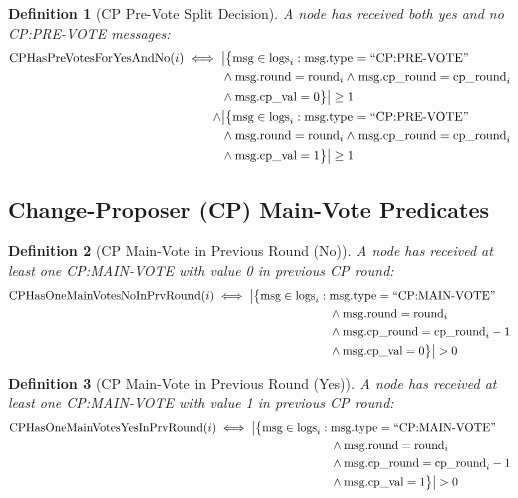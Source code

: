 \documentclass[11pt,a4paper,twoside]{article}
\newtheorem{definition}{Definition}[section]
\begin{document}
\begin{definition}[CP Pre-Vote Split Decision]
A node has received both yes and no CP:PRE-VOTE messages:
\begin{align}
\text{CPHasPreVotesForYesAndNo}(i) \iff {} & \big|\big\{\text{msg} \in \text{logs}_i : \text{msg.type} = \text{``CP:PRE-VOTE''} \notag \\
& \land \text{msg.round} = \text{round}_i \land \text{msg.cp\_round} = \text{cp\_round}_i \notag \\
& \land \text{msg.cp\_val} = 0\big\}\big| \geq 1 \notag \\
\land {} & \big|\big\{\text{msg} \in \text{logs}_i : \text{msg.type} = \text{``CP:PRE-VOTE''} \notag \\
& \land \text{msg.round} = \text{round}_i \land \text{msg.cp\_round} = \text{cp\_round}_i \notag \\
& \land \text{msg.cp\_val} = 1\big\}\big| \geq 1
\end{align}
\end{definition}

\subsection{Change-Proposer (CP) Main-Vote Predicates}

\begin{definition}[CP Main-Vote in Previous Round (No)]
A node has received at least one CP:MAIN-VOTE with value 0 in previous CP round:
\begin{align}
\text{CPHasOneMainVotesNoInPrvRound}(i) \iff \big|\big\{\text{msg} \in \text{logs}_i : {} & \text{msg.type} = \text{``CP:MAIN-VOTE''} \notag \\
& \land \text{msg.round} = \text{round}_i \notag \\
& \land \text{msg.cp\_round} = \text{cp\_round}_i - 1 \notag \\
& \land \text{msg.cp\_val} = 0\big\}\big| > 0
\end{align}
\end{definition}

\begin{definition}[CP Main-Vote in Previous Round (Yes)]
A node has received at least one CP:MAIN-VOTE with value 1 in previous CP round:
\begin{align}
\text{CPHasOneMainVotesYesInPrvRound}(i) \iff \big|\big\{\text{msg} \in \text{logs}_i : {} & \text{msg.type} = \text{``CP:MAIN-VOTE''} \notag \\
& \land \text{msg.round} = \text{round}_i \notag \\
& \land \text{msg.cp\_round} = \text{cp\_round}_i - 1 \notag \\
& \land \text{msg.cp\_val} = 1\big\}\big| > 0
\end{align}
\end{definition}
\end{document}
